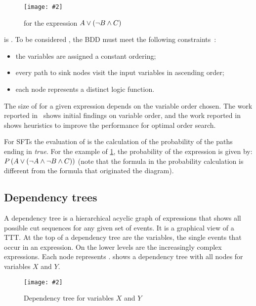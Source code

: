 \documentclass[en,twoside,onehalfspacing,phd]{risethesis}
\newcommand{\includegraphicsaspectratio}[2][1]{%
  \texttt{[image: \#2]}%
}
\newcommand{\parsin}[1]{\ensuremath\left( #1 \right)}
\def\probabilityop{\ensuremath P}
\newcommand{\probability}[1]{\ensuremath \probabilityop\parsin{#1}}
\begin{document}
\begin{figure}[t]
  \centering
  \includegraphicsaspectratio[0.25]{bdd-diagram-for-example-expression}
  \caption{ for the expression $A \lor \parsin{\lnot B \land C}$}
  \label{fig:bdd-diagram-for-example-expression}
\end{figure}

 is .
To be considered , the \ac{BDD} must meet the following constraints~\cite{BRB1990}: 
%
\begin{itemize}
  \item the variables are assigned a constant ordering;
  \item every path to sink nodes visit the input variables in ascending order;
  \item each node represents a distinct logic function.
\end{itemize}
%
The size of  for a given expression depends on the variable order chosen.
The work reported in~\cite{Rudell1993} shows initial findings on variable order, and the work reported in~\cite{KH2014} shows heuristics to improve the performance for optimal order search.

For \acp{SFT} the evaluation of  is the calculation of the probability of the paths ending in \emph{true}.
For the example of \cref{fig:bdd-diagram-for-example-expression}, the probability of the expression is given by: $\probability{A \lor \parsin{\lnot A \land \lnot B \land C}}$ (note that the formula in the probability calculation is different from the formula that originated the diagram).

\subsection{Dependency trees}
\label{sec:dependency-trees}

A dependency tree is a hierarchical acyclic graph of expressions that shows all possible cut sequences for any given set of events.
It is a graphical view of a \ac{TTT}.
At the top of a dependency tree are the variables, the single events that occur in an expression.
On the lower levels are the increasingly complex expressions.
Each node represents .
 shows a dependency tree with all nodes for variables $X$ and $Y$.

\begin{figure}
  \centering
  \includegraphicsaspectratio[0.5]{simple-dependency-tree}
  \caption{Dependency tree for variables $X$ and $Y$}
  \label{fig:simple-dependency-tree}
\end{figure}
\end{document}

